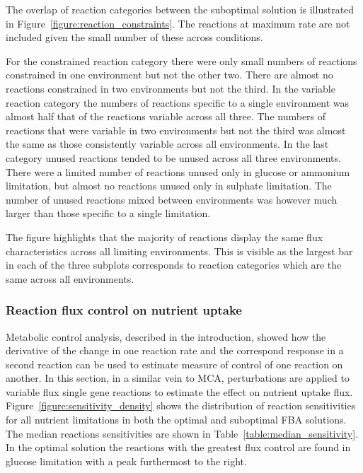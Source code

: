 The overlap of reaction categories between the suboptimal solution is illustrated in Figure~\vref{figure:reaction_constraints}. The reactions at maximum rate are not included given the small number of these across conditions.

For the constrained reaction category there were only small numbers of reactions constrained in one environment but not the other two. There are almost no reactions constrained in two environments but not the third. In the variable reaction category the numbers of reactions specific to a single environment was almost half that of the reactions variable across all three. The numbers of reactions that were variable in two environments but not the third was almost the same as those consistently variable across all environments. In the last category unused reactions tended to be unused across all three environments. There were a limited number of reactions unused only in glucose or ammonium limitation, but almost no reactions unused only in sulphate limitation. The number of unused reactions mixed between environments was however much larger than those specific to a single limitation.

The figure highlights that the majority of reactions display the same flux characteristics across all limiting environments. This is visible as the largest bar in each of the three subplots corresponds to reaction categories which are the same across all environments.

\subsubsection{Reaction flux control on nutrient uptake}%

Metabolic control analysis, described in the introduction, showed how the derivative of the change in one reaction rate and the correspond response in a second reaction can be used to estimate measure of control of one reaction on another. In this section, in a similar vein to MCA, perturbations are applied to variable flux single gene reactions to estimate the effect on nutrient uptake flux. Figure~\vref{figure:sensitivity_density} shows the distribution of reaction sensitivities for all nutrient limitations in both the optimal and suboptimal FBA solutions. The median reactions sensitivities are shown in Table~\vref{table:median_sensitivity}. In the optimal solution the reactions with the greatest flux control are found in glucose limitation with a peak furthermost to the right.


